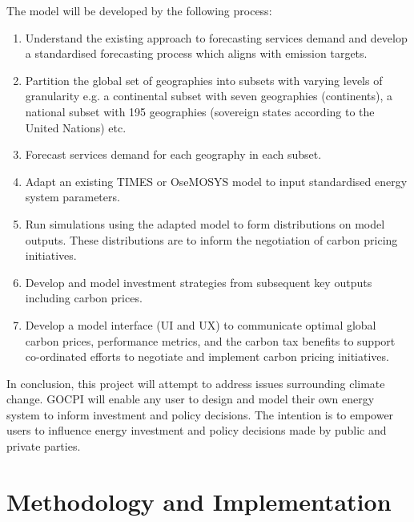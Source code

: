 \documentclass[12pt]{article}
\begin{document}
The model will be developed by the following process:

\begin{enumerate}
	\item Understand the existing approach to forecasting services demand and develop a standardised forecasting process which aligns with emission targets.
	\item Partition the global set of geographies into subsets with varying levels of granularity e.g. a continental subset with seven geographies (continents), a national subset with 195 geographies (sovereign states according to the United Nations) etc.
	\item Forecast services demand for each geography in each subset.
	\item Adapt an existing TIMES or OseMOSYS model to input standardised energy system parameters.
	\item Run simulations using the adapted model to form distributions on model outputs. These distributions are to inform the negotiation of carbon pricing initiatives.
	\item Develop and model investment strategies from subsequent key outputs including carbon prices.
	\item Develop a model interface (UI and UX) to communicate optimal global carbon prices, performance metrics, and the carbon tax benefits to support co-ordinated efforts to negotiate and implement carbon pricing initiatives.
\end{enumerate}

In conclusion, this project will attempt to address issues surrounding climate change. 
GOCPI will enable any user to design and model their own energy system to inform investment and policy decisions.
The intention is to empower users to influence energy investment and policy decisions made by public and private parties.

\section{Methodology and Implementation}
\end{document}
